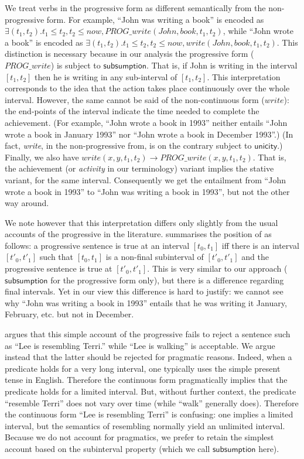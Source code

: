\documentclass[11pt,a4paper]{article}
\newcommand\constant[1]{\mathsf{#1}}
\begin{document}
We treat verbs in the progressive form as different semantically from
the non-progressive form. For example, ``John was writing a book'' is
encoded as
$∃(t_1, t_2). t_1≤ t_2, t_2 ≤ now, PROG\_write(John,book,t_1,t_2)$,
while ``John wrote a book'' is encoded as
$∃(t_1, t_2). t_1≤ t_2, t_2 ≤ now, write(John,book,t_1,t_2)$. This distinction is
necessary because in our analysis the progressive form ($PROG\_write$) is subject to
$\constant{subsumption}$. That is, if John is writing in the interval
$[t_1,t_2]$ then he is writing in any sub-interval of
$[t_1,t_2]$. This interpretation corresponds to the idea that the action takes place continuously over the whole interval.
However, the same cannot be said of the non-continuous form ($write$): the
end-points of the interval indicate the time needed to complete the
achievement. (For example, ``John wrote a book in 1993'' neither
entails ``John wrote a book in January 1993'' nor ``John wrote a book
in December 1993''.) (In fact, \emph{write}, in the non-progressive
from, is on the contrary subject to $\constant{unicity}$.) Finally, we
also have $write(x,y,t_1,t_2) → PROG\_write(x,y,t_1,t_2)$. That is,
the achievement (or \emph{activity} in our terminology) variant implies the stative variant, for the
same interval.  Consequently we get the entailment from ``John wrote a
book in 1993'' to ``John was writing a book in 1993'', but not the other way around.

We note however that this interpretation differs only slightly from
the usual accounts of the progressive in the
literature.  summarises the position of
\citet{bennett1978toward} as follows: a progressive sentence is true
at an interval $[t_0,t_1]$ iff there is an interval $[t'_0,t'_1]$ such
that $[t_0,t_1]$ is a non-final subinterval of $[t'_0,t'_1]$ and the
progressive sentence is true at $[t'_0,t'_1]$. This is very similar to
our approach ($\constant{subsumption}$ for the progressive form only),
but there is a difference regarding final intervals. Yet in our view
this difference is hard to justify: we cannot see why ``John was
writing a book in 1993'' entails that he was writing it January,
February, etc. but not in December.

 argues that this simple account of the
progressive fails to reject a sentence such as ``Lee is resembling
Terri.'' while ``Lee is walking'' is acceptable. We argue instead that
the latter should be rejected for pragmatic reasons. Indeed, when a
predicate holds for a very long interval, one typically uses the
simple present tense in English. Therefore the continuous form
pragmatically implies that the predicate holds for a limited interval.
But, without further context, the predicate ``resemble Terri'' does
not vary over time (while ``walk'' generally does). Therefore the
continuous form ``Lee is resembling Terri'' is confusing: one implies
a limited interval, but the semantics of resembling normally yield an unlimited interval.
%
Because we do not account for pragmatics, we prefer to retain the
simplest account based on the subinterval property (which we call
$\constant{subsumption}$ here).
\end{document}
